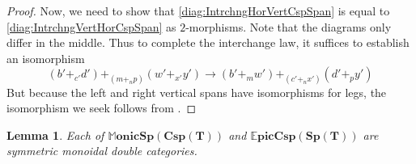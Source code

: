 \documentclass[11pt]{amsart}
\newcommand{\dblmonspcsp}[1]{\mathbb{M}\mathbf{onicSp(Csp(#1))}}
\newcommand{\dblepiccspsp}[1]{\mathbb{E}\mathbf{picCsp(Sp(#1))}}
\newtheorem{lem}[thm]{Lemma}
\theoremstyle{remark}
\theoremstyle{definition}
\begin{document}
\begin{proof}
	Now, we need to show that \eqref{diag:IntrchngHorVertCspSpan} is equal to \eqref{diag:IntrchngVertHorCspSpan} as $2$-morphisms.  Note that the diagrams only differ in the middle.  Thus to complete the interchange law, it suffices to establish an isomorphism 
	\[
	(b'+_{c'}d') +_{(m+_{n}p)} (w'+_{x'}y')
	\to 
	(b'+_{m}w')+_{(c'+_{n}x')}(d'+_{p}y')
	\]
	But because the left and right vertical spans have isomorphisms for legs, the isomorphism we seek follows from \cite[Lem.~2.5]{Cic}. 
\end{proof}


\begin{lem}
\label{lem:SpanCospanSM}
	Each of $\dblmonspcsp{T}$ and $\dblepiccspsp{T}$ are symmetric monoidal double categories.  
\end{lem}
\end{document}
